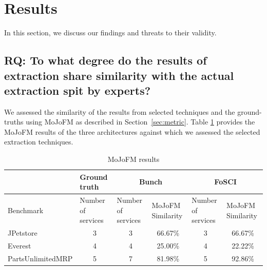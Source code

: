\section{Results}
\label{sec:results}
In this section, we discuss our findings and threats to their validity.

\subsection{RQ: To  what  degree  do  the  results  of  extraction  share similarity with the actual extraction spit by experts?}

We assessed the similarity of the results from selected techniques and the ground-truths using MoJoFM as described in Section~\ref{sec:metric}. Table
\ref{tab:mojo-results} provides the MoJoFM results of the three architectures against which we assessed the selected extraction techniques.

\begin{table}
\centering
\caption{MoJoFM results}
\label{tab:mojo-results}
\begin{tabular}{@{}|l|c|c|c|c|c|@{}}
\toprule
                  & \multicolumn{1}{l|}{Ground truth}       & \multicolumn{2}{c|}{Bunch}                                                       & \multicolumn{2}{c|}{FoSCI}                                                       \\ \midrule
Benchmark         & \multicolumn{1}{l|}{Number of services} & \multicolumn{1}{l|}{Number of services} & \multicolumn{1}{l|}{MoJoFM Similarity} & \multicolumn{1}{l|}{Number of services} & \multicolumn{1}{l|}{MoJoFM Similarity} \\ \midrule
JPetstore         & 3                                       & 3                                       & 66.67\%                                & 3                                       & 66.67\%                                \\ \midrule
Everest           & 4                                       & 4                                       & 25.00\%                                & 4                                       & 22.22\%                                \\ \midrule
PartsUnlimitedMRP & 5                                       & 7                                       & 81.98\%                                & 5                                       & 92.86\%                                \\ \bottomrule
\end{tabular}
\end{table}

